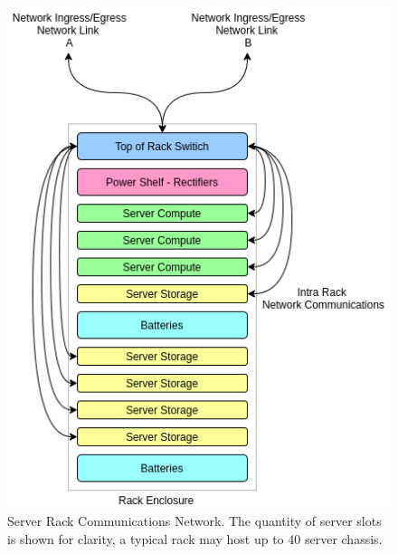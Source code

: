 \begin{figure} [!h]
\centering
\includegraphics[scale=.5]{methodology/images/Server Rack.png}
\caption[Server Rack Communications Network]{Server Rack Communications Network. The quantity of server slots is shown for clarity, a typical rack may host up to 40 server chassis.}
\label{img_server_rack}
\end{figure}